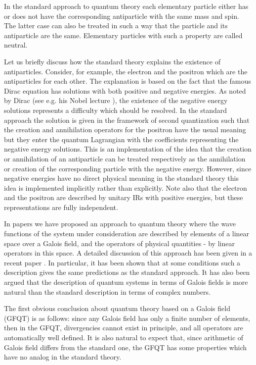 \documentclass[a4paper,12pt]{article}%
\begin{document}
In the standard approach to quantum theory each elementary 
particle either has or does not have the corresponding
antiparticle with the same mass and spin. The latter case can 
also be treated in such a way that the particle and its 
antiparticle are the same. Elementary particles with such 
a property are called neutral. 

Let us briefly discuss how the standard theory explains the
existence of antiparticles. Consider, for example, the
electron and the positron which are the antiparticles for
each other. The explanation is based on the fact that the
famous Dirac equation has solutions with both positive and
negative energies. As noted by Dirac (see e.g. his Nobel
lecture \cite{DirNobel}), the existence of the negative
energy solutions represents a difficulty which should be
resolved. In the standard approach the solution is given
in the framework of second quantization such that the
creation and annihilation operators for the positron have
the usual meaning but they enter the quantum Lagrangian 
with the coefficients representing the negative energy
solutions. This is an implementation of the idea that the
creation or annihilation of an antiparticle can be treated 
respectively as the annihilation or creation of the 
corresponding particle with the negative energy. However,
since negative energies have no direct physical meaning in
the standard theory this idea is implemented implicitly
rather than explicitly. Note also that the electron and
the positron are described by unitary IRs with positive
energies, but these representations are fully independent. 

In papers \cite{lev1} we have proposed an approach to
quantum theory where the wave functions of the system
under consideration are described by elements of a linear 
space over a Galois field, and the operators of physical 
quantities - by linear operators in this space. A detailed
discussion of this approach has been given in a recent paper
\cite{lev2}. In particular, it has been shown that at some
conditions such a description gives the same predictions as 
the standard approach. It has also been argued that the
description of quantum systems in terms of Galois fields 
is more natural than the standard description in terms of
complex numbers. 

The first obvious conclusion about 
quantum theory based on a Galois field (GFQT) is as
follows: since any Galois field has only a finite number of 
elements, then in the GFQT, divergencies cannot exist in 
principle, and all operators are automatically well defined.
It is also natural to expect that, since arithmetic of Galois 
field differs from the standard one, the GFQT has some 
properties which have no analog in the standard theory.  
\end{document}
